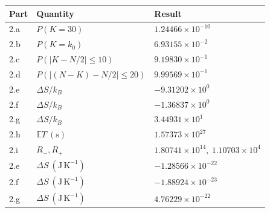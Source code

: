 \begin{tabular}{lll}\toprule Part & Quantity & Result \\\midrule
2.a & $P(K=30)$ & $1.24466\times10^{-10}$ \\
2.b & $P(K=k_0)$ & $6.93155\times10^{-2}$ \\
2.c & $P(|K-N/2|\leq10)$ & $9.19830\times10^{-1}$ \\
2.d & $P(|(N-K)-N/2|\leq20)$ & $9.99569\times10^{-1}$ \\
2.e & $\Delta S/k_B$ & $-9.31202\times10^{0}$ \\
2.f & $\Delta S/k_B$ & $-1.36837\times10^{0}$ \\
2.g & $\Delta S/k_B$ & $3.44931\times10^{1}$ \\
2.h & $\mathbb{E}T\ (\mathrm{s})$ & $1.57373\times10^{27}$ \\
2.i & $R_-,R_+$ & $1.80741\times10^{14},\ 1.10703\times10^{4}$ \\
\midrule
2.e & $\Delta S\ (\mathrm{J\,K^{-1}})$ & $-1.28566\times10^{-22}$ \\
2.f & $\Delta S\ (\mathrm{J\,K^{-1}})$ & $-1.88924\times10^{-23}$ \\
2.g & $\Delta S\ (\mathrm{J\,K^{-1}})$ & $4.76229\times10^{-22}$ \\
\bottomrule\end{tabular}
